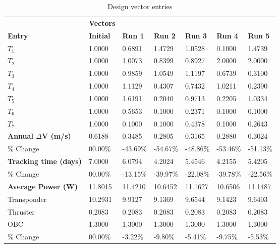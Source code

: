 \begin{table}[H]
\centering
\begin{tabular}{lllllll}
\textbf{} & \cellcolor[HTML]{EFEFEF}\textbf{Vectors} & \textbf{} & \textbf{} & \textbf{} & \textbf{} & \textbf{} \\
\rowcolor[HTML]{EFEFEF} \cellcolor[HTML]{EFEFEF}\textbf{Entry} & \cellcolor[HTML]{EFEFEF}\textbf{Initial} & \cellcolor[HTML]{EFEFEF}\textbf{Run 1} & \cellcolor[HTML]{EFEFEF}\textbf{Run 2} & \cellcolor[HTML]{EFEFEF}\textbf{Run 3} & \cellcolor[HTML]{EFEFEF}\textbf{Run 4} & \cellcolor[HTML]{EFEFEF}\textbf{Run 5} \\
$T_{1}$ & 1.0000 & 0.6891 & 1.4729 & 1.0528 & 0.1000 & 1.4739 \\
$T_{2}$ & 1.0000 & 1.0073 & 0.8399 & 0.8927 & 2.0000 & 2.0000 \\
$T_{3}$ & 1.0000 & 0.9859 & 1.0549 & 1.1197 & 0.6739 & 0.3100 \\
$T_{4}$ & 1.0000 & 1.1129 & 0.4307 & 0.7432 & 1.0211 & 0.2390 \\
$T_{5}$ & 1.0000 & 1.6191 & 0.2040 & 0.9713 & 0.2205 & 1.0334 \\
$T_{6}$ & 1.0000 & 0.5653 & 0.1000 & 0.2371 & 0.1000 & 0.1000 \\
$T_{7}$ & 1.0000 & 0.1000 & 0.1000 & 0.4378 & 0.1000 & 0.2643 \\
\rowcolor[HTML]{EFEFEF} 
\cellcolor[HTML]{EFEFEF}\textbf{Annual $\Delta \boldsymbol{V}$ (m/s)} & \cellcolor[HTML]{EFEFEF}0.6188 & 0.3485 & 0.2805 & 0.3165 & 0.2880 & 0.3024 \\
\% Change & 00.00\% &-43.69\% & -54.67\% & -48.86\% & -53.46\% & -51.13\% \\
\rowcolor[HTML]{EFEFEF} 
\cellcolor[HTML]{EFEFEF}\textbf{Tracking time (days)} & \cellcolor[HTML]{EFEFEF}7.0000 & 6.0794 & 4.2024 & 5.4546 & 4.2155 & 5.4205 \\
\% Change & 00.00\% &-13.15\% & -39.97\% & -22.08\% & -39.78\% & -22.56\% \\
\rowcolor[HTML]{EFEFEF} 
\cellcolor[HTML]{EFEFEF}\textbf{Average Power (W)} & \cellcolor[HTML]{EFEFEF}11.8015 & 11.4210 & 10.6452 & 11.1627 & 10.6506 & 11.1487 \\
Transponder & 10.2931 & 9.9127 & 9.1369 & 9.6544 & 9.1423 & 9.6403 \\
Thruster & 0.2083 & 0.2083 & 0.2083 & 0.2083 & 0.2083 & 0.2083 \\
OBC & 1.3000 & 1.3000 & 1.3000 & 1.3000 & 1.3000 & 1.3000 \\
\% Change & 00.00\% &-3.22\% & -9.80\% & -5.41\% & -9.75\% & -5.53\% \\
\end{tabular}
\caption{Design vector entries}
\label{tab:DesignVectorEntries_default28dur1len3intSHSRP}
\end{table}